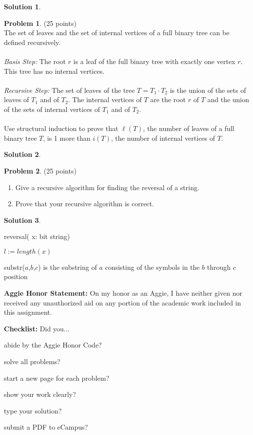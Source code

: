 \documentclass{article}
\theoremstyle{definition}
\newtheorem{problem}{Problem}
\newtheorem*{solution}{Solution}
\newcommand{\honor}{\noindent \textbf{Aggie Honor Statement: }On my honor as an Aggie, I have neither
  given nor received any unauthorized aid on any portion of the academic work included in this assignment.
}
\newcommand{\checklist}{\noindent\textbf{Checklist:}
Did you...
\begin{compactenum}
\item abide by the Aggie Honor Code?
\item solve all problems?
\item start a new page for each problem?
\item show your work clearly?
\item type your solution?
\item submit a PDF to eCampus?
\end{compactenum}
}
\begin{document}
\begin{solution}\ \\
\end{solution}

\newpage

\begin{problem} (25 points)\\
The set of leaves and the set of internal vertices of a full binary tree can be defined recursively.\\
\\
\textit{Basis Step:} The root $r$ is a leaf of the full binary tree with exactly one vertex $r$.  This tree has no internal vertices.\\
\\
\textit{Recursive Step:} The set of leaves of the tree $T=T_1\cdot T_2$ is the union of the sets of leaves of $T_1$ and of $T_2$.  The internal vertices of $T$ are the root $r$ of $T$ and the union of the sets of internal vertices of $T_1$ and of $T_2$.\\
\\
Use structural induction to prove that $\ell(T)$, the number of leaves of a full binary tree $T$, is 1 more than $i(T)$, the number of internal vertices of $T$.
\end{problem}

\begin{solution}\ \\
\end{solution}

\newpage

\begin{problem} (25 points)
\begin{enumerate}
\item Give a recursive algorithm for finding the reversal of a string.
\item Prove that your recursive algorithm is correct.
\end{enumerate}
\end{problem}

\begin{solution}\ \\
\begin{algorithm}
\DontPrintSemicolon
\caption{reversal( x: bit string)}
$l := length(x)$\;
\end{algorithm}
substr($a$,$b$,$c$) is the substring of $a$ consisting of the symbols in the $b$ through $c$ position
\end{solution}

\newpage


\bigskip
\honor

\bigskip
\checklist
\end{document}
